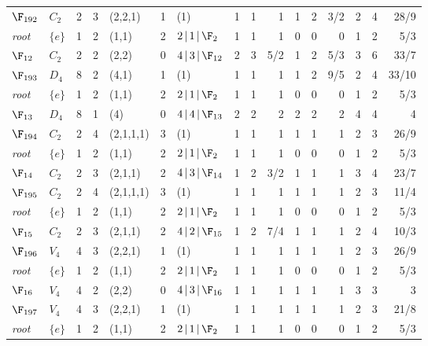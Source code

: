 \begin{landscape}
{\begin{longtable}{@{}l l r r l r l rrr rrr rrr@{}}
\addlinespace[3pt]
\textbf{$\F_{192}$} & $C_{2}$ & 2 & 3 & (2,2,1) & 1 & (1) & 1 & 1 & 1 & 1 & 2 & 3/2 & 2 & 4 & 28/9 \\
\quad\textit{root} & $\{e\}$ & 1 & 2 & (1,1) & 2 & $2\,|\,1\,|\,\F_{2}$ & 1 & 1 & 1 & 0 & 0 & 0 & 1 & 2 & 5/3 \\
\quad$\F_{12}$ & $C_{2}$ & 2 & 2 & (2,2) & 0 & $4\,|\,3\,|\,\F_{12}$ & 2 & 3 & 5/2 & 1 & 2 & 5/3 & 3 & 6 & 33/7 \\
\addlinespace[3pt]
\textbf{$\F_{193}$} & $D_{4}$ & 8 & 2 & (4,1) & 1 & (1) & 1 & 1 & 1 & 1 & 2 & 9/5 & 2 & 4 & 33/10 \\
\quad\textit{root} & $\{e\}$ & 1 & 2 & (1,1) & 2 & $2\,|\,1\,|\,\F_{2}$ & 1 & 1 & 1 & 0 & 0 & 0 & 1 & 2 & 5/3 \\
\quad$\F_{13}$ & $D_{4}$ & 8 & 1 & (4) & 0 & $4\,|\,4\,|\,\F_{13}$ & 2 & 2 & 2 & 2 & 2 & 2 & 4 & 4 & 4 \\
\addlinespace[3pt]
\textbf{$\F_{194}$} & $C_{2}$ & 2 & 4 & (2,1,1,1) & 3 & (1) & 1 & 1 & 1 & 1 & 1 & 1 & 2 & 3 & 26/9 \\
\quad\textit{root} & $\{e\}$ & 1 & 2 & (1,1) & 2 & $2\,|\,1\,|\,\F_{2}$ & 1 & 1 & 1 & 0 & 0 & 0 & 1 & 2 & 5/3 \\
\quad$\F_{14}$ & $C_{2}$ & 2 & 3 & (2,1,1) & 2 & $4\,|\,3\,|\,\F_{14}$ & 1 & 2 & 3/2 & 1 & 1 & 1 & 3 & 4 & 23/7 \\
\addlinespace[3pt]
\textbf{$\F_{195}$} & $C_{2}$ & 2 & 4 & (2,1,1,1) & 3 & (1) & 1 & 1 & 1 & 1 & 1 & 1 & 2 & 3 & 11/4 \\
\quad\textit{root} & $\{e\}$ & 1 & 2 & (1,1) & 2 & $2\,|\,1\,|\,\F_{2}$ & 1 & 1 & 1 & 0 & 0 & 0 & 1 & 2 & 5/3 \\
\quad$\F_{15}$ & $C_{2}$ & 2 & 3 & (2,1,1) & 2 & $4\,|\,2\,|\,\F_{15}$ & 1 & 2 & 7/4 & 1 & 1 & 1 & 2 & 4 & 10/3 \\
\addlinespace[3pt]
\textbf{$\F_{196}$} & $V_{4}$ & 4 & 3 & (2,2,1) & 1 & (1) & 1 & 1 & 1 & 1 & 1 & 1 & 2 & 3 & 26/9 \\
\quad\textit{root} & $\{e\}$ & 1 & 2 & (1,1) & 2 & $2\,|\,1\,|\,\F_{2}$ & 1 & 1 & 1 & 0 & 0 & 0 & 1 & 2 & 5/3 \\
\quad$\F_{16}$ & $V_{4}$ & 4 & 2 & (2,2) & 0 & $4\,|\,3\,|\,\F_{16}$ & 1 & 1 & 1 & 1 & 1 & 1 & 3 & 3 & 3 \\
\addlinespace[3pt]
\textbf{$\F_{197}$} & $V_{4}$ & 4 & 3 & (2,2,1) & 1 & (1) & 1 & 1 & 1 & 1 & 1 & 1 & 2 & 3 & 21/8 \\
\quad\textit{root} & $\{e\}$ & 1 & 2 & (1,1) & 2 & $2\,|\,1\,|\,\F_{2}$ & 1 & 1 & 1 & 0 & 0 & 0 & 1 & 2 & 5/3 \\

\end{longtable}}
\end{landscape}
